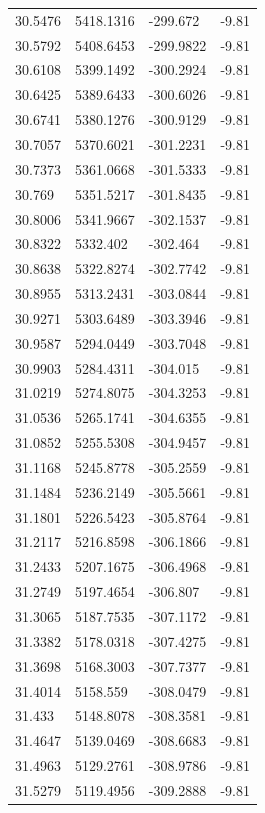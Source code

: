 \begin{table}[H]
\begin{tabular}{llll}
30.5476 & 5418.1316 & -299.672 & -9.81 \\
30.5792 & 5408.6453 & -299.9822 & -9.81 \\
30.6108 & 5399.1492 & -300.2924 & -9.81 \\
30.6425 & 5389.6433 & -300.6026 & -9.81 \\
30.6741 & 5380.1276 & -300.9129 & -9.81 \\
30.7057 & 5370.6021 & -301.2231 & -9.81 \\
30.7373 & 5361.0668 & -301.5333 & -9.81 \\
30.769 & 5351.5217 & -301.8435 & -9.81 \\
30.8006 & 5341.9667 & -302.1537 & -9.81 \\
30.8322 & 5332.402 & -302.464 & -9.81 \\
30.8638 & 5322.8274 & -302.7742 & -9.81 \\
30.8955 & 5313.2431 & -303.0844 & -9.81 \\
30.9271 & 5303.6489 & -303.3946 & -9.81 \\
30.9587 & 5294.0449 & -303.7048 & -9.81 \\
30.9903 & 5284.4311 & -304.015 & -9.81 \\
31.0219 & 5274.8075 & -304.3253 & -9.81 \\
31.0536 & 5265.1741 & -304.6355 & -9.81 \\
31.0852 & 5255.5308 & -304.9457 & -9.81 \\
31.1168 & 5245.8778 & -305.2559 & -9.81 \\
31.1484 & 5236.2149 & -305.5661 & -9.81 \\
31.1801 & 5226.5423 & -305.8764 & -9.81 \\
31.2117 & 5216.8598 & -306.1866 & -9.81 \\
31.2433 & 5207.1675 & -306.4968 & -9.81 \\
31.2749 & 5197.4654 & -306.807 & -9.81 \\
31.3065 & 5187.7535 & -307.1172 & -9.81 \\
31.3382 & 5178.0318 & -307.4275 & -9.81 \\
31.3698 & 5168.3003 & -307.7377 & -9.81 \\
31.4014 & 5158.559 & -308.0479 & -9.81 \\
31.433 & 5148.8078 & -308.3581 & -9.81 \\
31.4647 & 5139.0469 & -308.6683 & -9.81 \\
31.4963 & 5129.2761 & -308.9786 & -9.81 \\
31.5279 & 5119.4956 & -309.2888 & -9.81 \\

\end{tabular}
\end{table}

